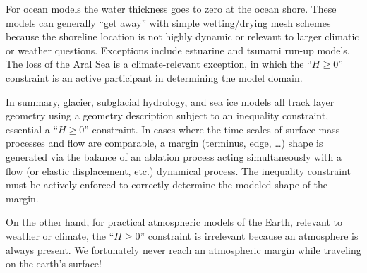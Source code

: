 \documentclass[12pt]{amsart}
\begin{document}
For ocean models the water thickness goes to zero at the ocean shore.  These models can generally ``get away'' with simple wetting/drying mesh schemes because the shoreline location is not highly dynamic or relevant to larger climatic or weather questions.  Exceptions include estuarine and tsunami run-up models.  The loss of the Aral Sea is a climate-relevant exception, in which the ``$H\ge 0$'' constraint is an active participant in determining the model domain.

In summary, glacier, subglacial hydrology, and sea ice models all track layer geometry using a geometry description subject to an inequality constraint, essential a ``$H\ge 0$'' constraint.  In cases where the time scales of surface mass processes and flow are comparable, a margin (terminus, edge, \dots) shape is generated via the balance of an ablation process acting simultaneously with a flow (or elastic displacement, etc.) dynamical process.  The inequality constraint must be actively enforced to correctly determine the modeled shape of the margin.

On the other hand, for practical atmospheric models of the Earth, relevant to weather or climate, the ``$H\ge 0$'' constraint is irrelevant because an atmosphere is always present.  We fortunately never reach an atmospheric margin while traveling on the earth's surface!
\end{document}
